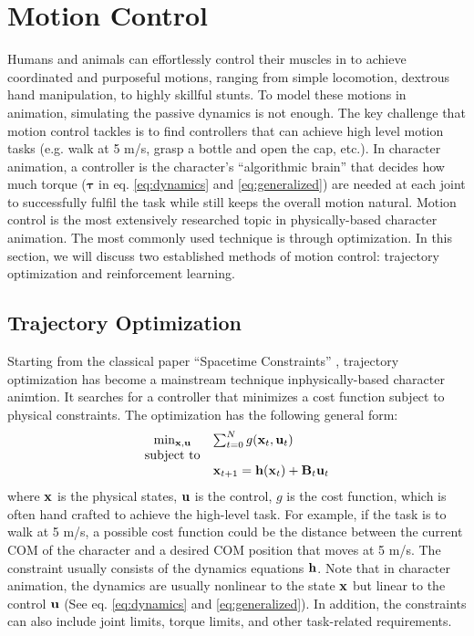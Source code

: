\section{Motion Control}
Humans and animals can effortlessly control their muscles in to achieve coordinated and purposeful motions, ranging from simple locomotion, dextrous hand manipulation, to highly skillful stunts. To model these motions in animation, simulating the passive dynamics is not enough. The key challenge that motion control tackles is to find controllers that can achieve high level motion tasks (e.g. walk at 5 m/s, grasp a bottle and open the cap, etc.). In character animation, a controller is the character's ``algorithmic brain'' that decides how much torque ($\boldsymbol{\tau}$ in eq. \ref{eq:dynamics} and \ref{eq:generalized}) are needed at each joint to successfully fulfil the task while still keeps the overall motion natural. Motion control is the most extensively researched topic in physically-based character animation. The most commonly used technique is through optimization. In this section, we will discuss two established methods of motion control: trajectory optimization and reinforcement learning.

\subsection{Trajectory Optimization}

Starting from the classical paper ``Spacetime Constraints'' \cite{Witkin:1988}, trajectory optimization has become a mainstream technique inphysically-based character animtion. It searches for a controller that minimizes a cost function subject to physical constraints. The optimization has the following general form:
\begin{equation}
  \begin{array}{cl}
    \min_{\vc{x},\vc{u}}&\sum_{t=0}^{N}g(\vc{x}_t,\vc{u}_t)\\
    \textrm{subject to}&\\
    &\vc{x}_{t+1}=\vc{h}(\vc{x}_t)+\vc{B}_t\vc{u}_t
  \end{array}
  \label{eq:trajectoryOptimization}
\end{equation}
where $\mathbf{x}$ is the physical states, $\mathbf{u}$ is the control, $g$ is the cost function, which is often hand crafted to achieve the high-level task. For example, if the task is to walk at 5 m/s, a possible cost function could be the distance between the current COM of the character and a desired COM position that moves at 5 m/s. The constraint usually consists of the dynamics equations $\mathbf{h}$. Note that in character animation, the dynamics are usually nonlinear to the state $\mathbf{x}$ but linear to the control $\mathbf{u}$ (See eq. \ref{eq:dynamics} and \ref{eq:generalized}). In addition, the constraints can also include joint limits, torque limits, and other task-related requirements.

